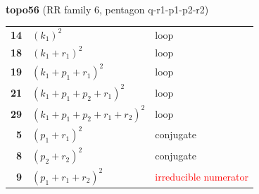 \documentclass[10pt]{article}
\begin{document}
\begin{minipage}[t]{0.48\textwidth}
{}\\[2mm]\textbf{topo56} (RR family 6, pentagon q-r1-p1-p2-r2)\\[2pt]{\footnotesize\begin{tabular}{@{}r@{\ \ }l@{\ \ }l@{}}\textbf{14} & $(k_1)^2$ & loop\\
\textbf{18} & $(k_1+r_1)^2$ & loop\\
\textbf{19} & $(k_1+p_1+r_1)^2$ & loop\\
\textbf{21} & $(k_1+p_1+p_2+r_1)^2$ & loop\\
\textbf{29} & $(k_1+p_1+p_2+r_1+r_2)^2$ & loop\\
\textbf{5} & $(p_1+r_1)^2$ & conjugate\\
\textbf{8} & $(p_2+r_2)^2$ & conjugate\\
\textbf{9} & $(p_1+r_1+r_2)^2$ & \textcolor{red}{irreducible numerator}\\\end{tabular}}\end{minipage}

\bigskip
\end{document}

